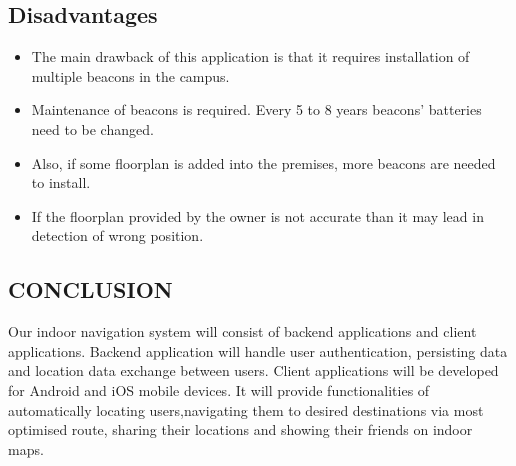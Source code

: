 ﻿\documentclass[a4paper, 12pt]{article}
\begin{document}
\subsection{Disadvantages}
\begin{itemize}
	\item The main drawback of this application is that it requires installation of multiple beacons in the campus.
	\item Maintenance of beacons is required. Every 5 to 8 years beacons’ batteries need to be changed.
	\item 	Also, if some floorplan is added into the premises, more beacons are needed to install.
	\item If the floorplan provided by the owner is not accurate than it may lead in detection of wrong position.

\end{itemize}

\newpage


\begin{center}
\section{CONCLUSION}
\end{center}
\par
Our indoor navigation system will consist of backend applications and client applications. Backend application will handle user authentication, persisting data and location data exchange between users. Client applications will be developed for Android and iOS mobile devices. It will provide functionalities of automatically locating users,navigating them to desired destinations via most optimised route, sharing their locations and showing their friends on indoor maps. 
\\

\newpage

%
%

\end{document}
